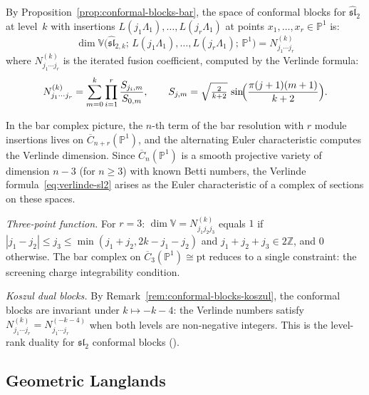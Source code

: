 \begin{example}\label{ex:conformal-blocks-sl2}
By Proposition~\ref{prop:conformal-blocks-bar}, the space of
conformal blocks for $\widehat{\mathfrak{sl}}_2$ at level~$k$
with insertions $L(j_1\Lambda_1), \ldots, L(j_r\Lambda_1)$
at points $x_1, \ldots, x_r \in \mathbb{P}^1$ is:
\[
\dim \mathbb{V}\bigl(
\widehat{\mathfrak{sl}}_{2,k};\,
L(j_1\Lambda_1), \ldots, L(j_r\Lambda_1);\, \mathbb{P}^1
\bigr)
= N_{j_1 \cdots j_r}^{(k)}
\]
where $N_{j_1 \cdots j_r}^{(k)}$ is the iterated fusion
coefficient, computed by the Verlinde formula:
\begin{equation}\label{eq:verlinde-sl2}
N_{j_1 \cdots j_r}^{(k)}
= \sum_{m=0}^{k}
\prod_{i=1}^{r}
\frac{S_{j_i,m}}{S_{0,m}},
\qquad
S_{j,m} = \sqrt{\tfrac{2}{k+2}}\,
\sin\!\Bigl(\frac{\pi(j+1)(m+1)}{k+2}\Bigr).
\end{equation}

In the bar complex picture, the $n$-th term of the bar resolution
with $r$ module insertions lives on
$\overline{C}_{n+r}(\mathbb{P}^1)$, and the alternating Euler
characteristic computes the Verlinde dimension.  Since
$\overline{C}_n(\mathbb{P}^1)$ is a smooth projective variety
of dimension $n - 3$ (for $n \geq 3$) with known Betti numbers,
the Verlinde formula~\eqref{eq:verlinde-sl2} arises as the
Euler characteristic of a complex of sections on these spaces.

\emph{Three-point function.}
For $r = 3$: $\dim \mathbb{V} = N_{j_1 j_2 j_3}^{(k)}$ equals
$1$ if $|j_1 - j_2| \leq j_3 \leq \min(j_1+j_2,
2k - j_1 - j_2)$ and $j_1 + j_2 + j_3 \in 2\mathbb{Z}$, and
$0$ otherwise.  The bar complex on
$\overline{C}_3(\mathbb{P}^1) \cong \mathrm{pt}$ reduces to a
single constraint: the screening charge integrability condition.

\emph{Koszul dual blocks.}
By Remark~\ref{rem:conformal-blocks-koszul}, the conformal blocks
are invariant under $k \mapsto -k - 4$: the Verlinde numbers
satisfy $N^{(k)}_{j_1 \cdots j_r} = N^{(-k-4)}_{j_1 \cdots j_r}$
when both levels are non-negative integers.  This is the
level-rank duality for $\mathfrak{sl}_2$ conformal blocks
(\cite{NakanishiTsuchiya}).
\end{example}

\subsection{Geometric Langlands}

